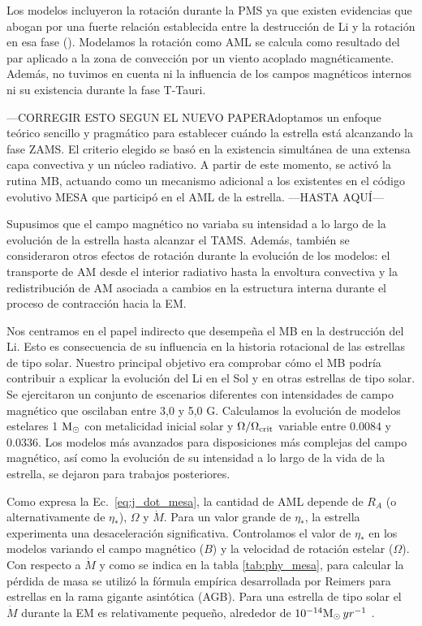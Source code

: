 Los modelos incluyeron la rotación durante la PMS ya que existen evidencias que abogan por una fuerte relación establecida entre la destrucción de Li y la rotación en esa fase (\cite{Bouvier2016,Bouvier2018}). Modelamos la rotación como AML se calcula como resultado del par aplicado a la zona de convección por un viento acoplado magnéticamente. Además, no tuvimos en cuenta ni la influencia de los campos magnéticos internos ni su existencia durante la fase T-Tauri.\par 
---CORREGIR ESTO SEGUN EL NUEVO PAPERAdoptamos un enfoque teórico sencillo y pragmático para establecer cuándo la estrella está alcanzando la fase ZAMS. El criterio elegido se basó en la existencia simultánea de una extensa capa convectiva y un núcleo radiativo. A partir de este momento, se activó la rutina MB, actuando como un mecanismo adicional a los existentes en el código evolutivo MESA que participó en el AML de la estrella. ---HASTA AQUÍ---\par

Supusimos que el campo magnético no variaba su intensidad a lo largo de la evolución de la estrella hasta alcanzar el TAMS. Además, también se consideraron otros efectos de rotación durante la evolución de los modelos: el transporte de AM desde el interior radiativo hasta la envoltura convectiva y la redistribución de AM asociada a cambios en la estructura interna durante el proceso de contracción hacia la EM.\par

Nos centramos en el papel indirecto que desempeña el MB en la destrucción del Li. Esto es consecuencia de su influencia en la historia rotacional de las estrellas de tipo solar. Nuestro principal objetivo era comprobar cómo el MB podría contribuir a explicar la evolución del Li en el Sol y en otras estrellas de tipo solar. Se ejercitaron un conjunto de escenarios diferentes con intensidades de campo magnético que oscilaban entre 3,0 y 5,0 G. Calculamos la evolución de modelos estelares 1 $\mathrm{M}_\odot$ con metalicidad inicial solar y $\Omega / \Omega_{\mathrm{crit}}$ variable entre $0.0084$ y $0.0336$. Los modelos más avanzados para disposiciones más complejas del campo magnético, así como la evolución de su intensidad a lo largo de la vida de la estrella, se dejaron para trabajos posteriores.\par

Como expresa la Ec.~\ref{eq:j_dot_mesa}, la cantidad de AML depende de $R_A$ (o alternativamente de $\eta_*$), $\Omega$ y $\Dot{M}$. Para un valor grande de $\eta_*$, la estrella experimenta una desaceleración significativa. Controlamos el valor de $\eta_*$ en los modelos variando el campo magnético ($B$) y la velocidad de rotación estelar ($\Omega$). Con respecto a $\Dot{M}$ y como se indica en la tabla \ref{tab:phy_mesa}, para calcular la pérdida de masa se utilizó la fórmula empírica desarrollada por Reimers \cite{Reimers1975} para estrellas en la rama gigante asintótica (AGB). Para una estrella de tipo solar el $\Dot{M}$ durante la EM es relativamente pequeño, alrededor de $10^{-14}\mathrm{M}_\odot \, yr^{-1}$ \cite{Noerdlinger2008}. \par

